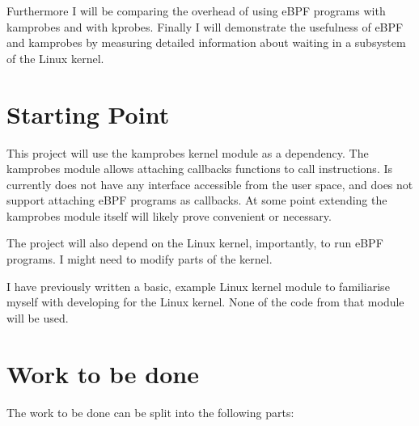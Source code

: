     Furthermore I will be comparing the overhead of using eBPF programs with kamprobes and with kprobes. 
    Finally I will demonstrate the usefulness of eBPF and kamprobes by measuring detailed information 
    about waiting in a subsystem of the Linux kernel.
 
\section*{Starting Point}

    This project will use the kamprobes kernel module as a dependency.
    The kamprobes module allows attaching callbacks functions to call instructions.
    Is currently does not have any interface accessible from the user space, and does not support
    attaching eBPF programs as callbacks.
    At some point extending the kamprobes module itself will likely prove convenient or necessary.

    The project will also depend on the Linux kernel, importantly, to run eBPF programs.
    I might need to modify parts of the kernel.


    I have previously written a basic, example Linux kernel module to familiarise myself with developing for the 
    Linux kernel. None of the code from that module will be used. 

\section*{Work to be done}

    The work to be done can be split into the following parts:

